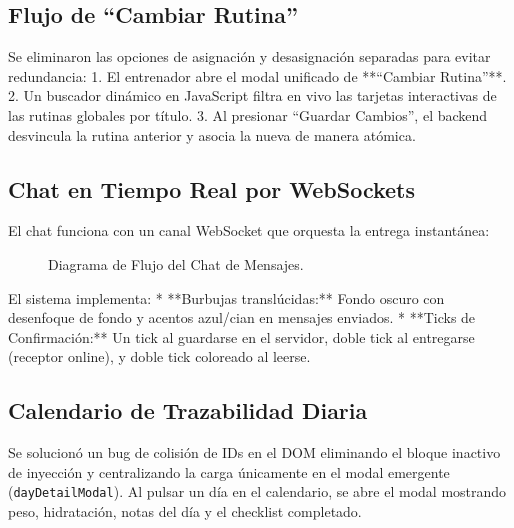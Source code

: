 \documentclass[11pt]{article}
\begin{document}
\subsection{Flujo de ``Cambiar Rutina''}
Se eliminaron las opciones de asignación y desasignación separadas para evitar redundancia:
1.  El entrenador abre el modal unificado de **``Cambiar Rutina''**.
2.  Un buscador dinámico en JavaScript filtra en vivo las tarjetas interactivas de las rutinas globales por título.
3.  Al presionar ``Guardar Cambios'', el backend desvincula la rutina anterior y asocia la nueva de manera atómica.

\subsection{Chat en Tiempo Real por WebSockets}
El chat funciona con un canal WebSocket que orquesta la entrega instantánea:

\begin{figure}[h]
\centering
{}
\caption{Diagrama de Flujo del Chat de Mensajes.}
\end{figure}

El sistema implementa:
*   **Burbujas translúcidas:** Fondo oscuro con desenfoque de fondo y acentos azul/cian en mensajes enviados.
*   **Ticks de Confirmación:** Un tick al guardarse en el servidor, doble tick al entregarse (receptor online), y doble tick coloreado al leerse.

\subsection{Calendario de Trazabilidad Diaria}
Se solucionó un bug de colisión de IDs en el DOM eliminando el bloque inactivo de inyección y centralizando la carga únicamente en el modal emergente (\texttt{dayDetailModal}). Al pulsar un día en el calendario, se abre el modal mostrando peso, hidratación, notas del día y el checklist completado.
\end{document}
